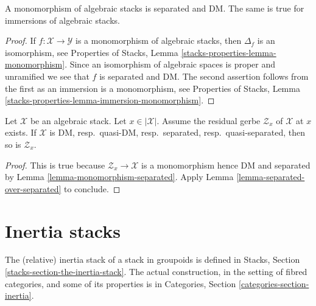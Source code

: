 \begin{lemma}
\label{lemma-monomorphism-separated}
A monomorphism of algebraic stacks is separated and DM.
The same is true for immersions of algebraic stacks.
\end{lemma}

\begin{proof}
If $f : \mathcal{X} \to \mathcal{Y}$ is a monomorphism of algebraic stacks,
then $\Delta_f$ is an isomorphism, see
Properties of Stacks, Lemma \ref{stacks-properties-lemma-monomorphism}.
Since an isomorphism of algebraic spaces is proper and unramified we
see that $f$ is separated and DM. The second assertion follows from the
first as an immersion is a monomorphism, see
Properties of Stacks,
Lemma \ref{stacks-properties-lemma-immersion-monomorphism}.
\end{proof}

\begin{lemma}
\label{lemma-separation-properties-residual-gerbe}
Let $\mathcal{X}$ be an algebraic stack. Let $x \in |\mathcal{X}|$.
Assume the residual gerbe $\mathcal{Z}_x$ of $\mathcal{X}$ at $x$ exists.
If $\mathcal{X}$ is DM, resp.\ quasi-DM, resp.\ separated,
resp.\ quasi-separated, then so is $\mathcal{Z}_x$.
\end{lemma}

\begin{proof}
This is true because $\mathcal{Z}_x \to \mathcal{X}$ is a monomorphism
hence DM and separated by
Lemma \ref{lemma-monomorphism-separated}.
Apply
Lemma \ref{lemma-separated-over-separated}
to conclude.
\end{proof}


















\section{Inertia stacks}
\label{section-inertia}

\noindent
The (relative) inertia stack of a stack in groupoids is defined in
Stacks, Section \ref{stacks-section-the-inertia-stack}.
The actual construction, in the setting of fibred categories, and some
of its properties is in
Categories, Section \ref{categories-section-inertia}.

